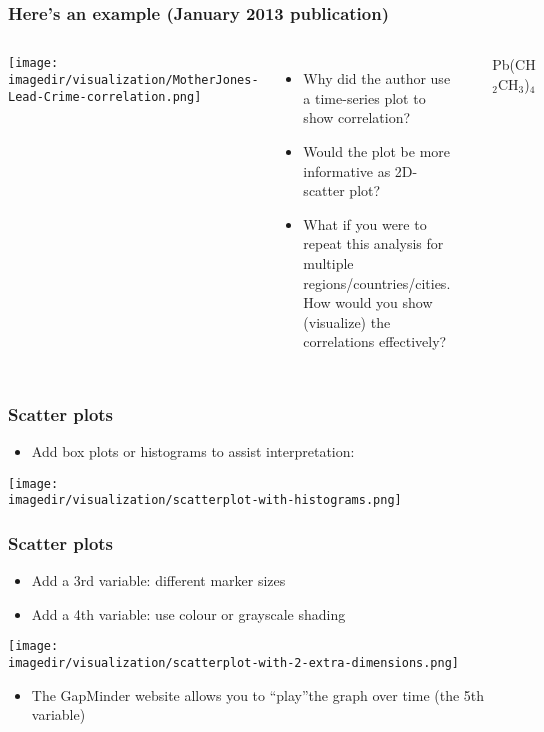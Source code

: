 \begin{frame}\frametitle{Here's an example (January 2013 publication)}
	\begin{columns}[t]
			\begin{center}
				\texttt{[image: \\imagedir/visualization/MotherJones-Lead-Crime-correlation.png]}
			\end{center}
			\begin{itemize}
				\item	Why did the author use a time-series plot to show correlation?
				\item	Would the plot be more informative as 2D-scatter plot?
				\item	What if you were to repeat this analysis for multiple regions/countries/cities. How would you show (visualize) the correlations effectively?
			\end{itemize}
			\hrule
			\vspace{4pt}
			{\hfill Pb(CH$_2$CH$_3$)$_4$}
	\end{columns}
	\vspace{-8pt}
\end{frame}

\begin{frame}\frametitle{Scatter plots}
	\begin{itemize}
		\item	Add box plots or histograms to assist interpretation: 
	\end{itemize}
	\begin{center}
		\texttt{[image: \\imagedir/visualization/scatterplot-with-histograms.png]}
	\end{center}
\end{frame}

\begin{frame}\frametitle{Scatter plots}
	\begin{itemize}
		\item	Add a 3rd variable: different marker sizes 
		\item	Add a 4th variable: use colour or grayscale shading 
	\end{itemize}
	\begin{center}
		\texttt{[image: \\imagedir/visualization/scatterplot-with-2-extra-dimensions.png]}
	\end{center}
	\begin{itemize}
		\item	The GapMinder website allows you to ``play''the graph over time (the 5th variable) 
	\end{itemize}
\end{frame}

